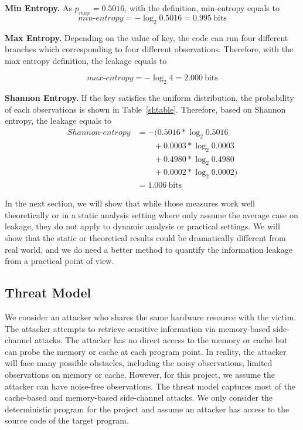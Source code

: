 \vspace{3pt}
\textbf{Min Entropy.}
As $p_{\mathit{max}} = 0.5016$, with the definition, min-entropy equals to
\begin{displaymath}
    \mathit{min\text{-}entropy} = -\log_2{0.5016} = 0.995\ \mathrm{bits}
\end{displaymath}

\textbf{Max Entropy.}
Depending on the value of key, the code can run four different branches which
corresponding to four different observations. Therefore, with the max entropy
definition, the leakage equals to

\begin{displaymath}
    \mathit{max\text{-}entropy} = -\log_2{4} = 2.000\ \mathrm{bits}
\end{displaymath}

\vspace{3pt}
\textbf{Shannon Entropy.}
If the key satisfies the uniform distribution, the probability of each
observations is shown in Table~\ref{shtable}. Therefore, based on Shannon
entropy, the leakage equals to
\begin{align*}
    \mathit{Shannon\text{-}entropy} & = -(0.5016*\log_{2}0.5016      \\
                                    & \qquad+ 0.0003*\log_{2}0.0003  \\
                                    & \qquad+ 0.4980*\log_{2}0.4980  \\
                                    & \qquad+ 0.0002*\log_{2}0.0002) \\
                                    & = 1.006\ \mathrm{bits}
\end{align*}

In the next section, we will show that while those measures work well
theoretically or in a static analysis setting where only assume the average case
on leakage, they do not apply to dynamic analysis or practical settings. We will
show that the static or theoretical results could be dramatically different from
real world, and we do need a better method to quantify the information leakage
from a practical point of view.

\subsection{Threat Model}
We consider an attacker who shares the same hardware resource with the victim.
The attacker attempts to retrieve sensitive information via memory-based
side-channel attacks. The attacker has no direct access to the memory or cache
but can probe the memory or cache at each program point. In reality, the
attacker will face many possible obstacles, including the noisy observations,
limited observations on memory or cache. However, for this project, we assume
the attacker can have noise-free observations. The threat model captures most of
the cache-based and memory-based side-channel attacks. We only consider the
deterministic program for the project and assume an attacker has access to the
source code of the target program.
